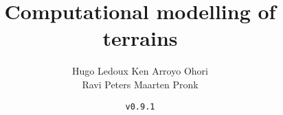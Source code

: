\documentclass[
  fontsize=10pt, %
  twoside=true, %
  secnumdepth=1, %
  numbers=noenddot, %
]{kaobook}
\begin{document}


\title{Computational modelling of terrains}
\author{Hugo Ledoux \hspace{10mm} Ken Arroyo Ohori\\ Ravi Peters \hspace{17mm} Maarten Pronk}
\date{\texttt{v0.9.1}}

\publishers{\vspace{15mm}\texttt{[image: front-back/nl\_joydivision.png]}}


\frontmatter %










\maketitle
{}
\end{document}
